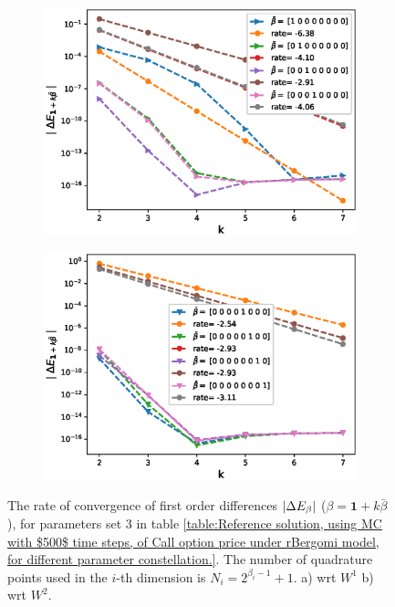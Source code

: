 \begin{figure}[h!]
	\centering
	\begin{subfigure}{.3\textwidth}
		\centering
		\includegraphics[width=1\linewidth]{./figures/rBergomi_mixed_error_rates/without_change_measure/N_4/H_002/first_difference_rbergomi_4steps_H_002_K_1_totally_hierarch_with_rate_W1}
		\caption{}
		\label{fig:sub3}
	\end{subfigure}%
	\begin{subfigure}{.3\textwidth}
		\centering
		\includegraphics[width=1\linewidth]{./figures/rBergomi_mixed_error_rates/without_change_measure/N_4/H_002/first_difference_rbergomi_4steps_H_002_K_1_totally_hierarch_with_rate_W2}
		\caption{}
		\label{fig:sub4}
	\end{subfigure}
	
	
	
	\caption{The rate of convergence of  first order differences $\left\lvert\Delta E_{\beta}\right\rvert$ ($\beta=\mathbf{1}+k \bar{\beta}$), for parameters set $3$ in table \ref{table:Reference solution, using MC with $500$ time steps, of Call option price under rBergomi model, for different parameter constellation.}. The number of quadrature points used in the $i$-th dimension is $N_i=2^{\beta_i-1}+1$. a) wrt $W^1$ b) wrt $W^2$.}
	\label{fig:first_diff_comp_K_1_H_002}
\end{figure}


